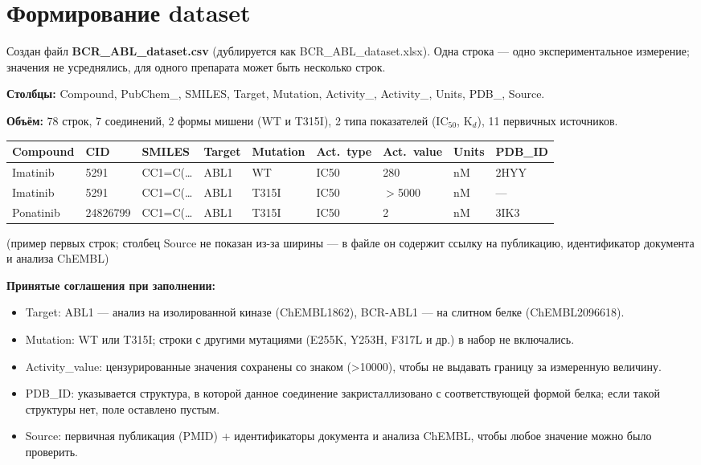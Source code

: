 \documentclass[12pt,a4paper]{article}
\newcommand{\code}[1]{{\ttfamily #1}}
\begin{document}
\section{Формирование dataset}

Создан файл \textbf{\code{BCR\_ABL\_dataset.csv}} (дублируется как
\code{BCR\_ABL\_dataset.xlsx}). Одна строка --- одно экспериментальное измерение;
значения не усреднялись, для одного препарата может быть несколько строк.

\medskip
\noindent\textbf{Столбцы:} \code{Compound}, \code{PubChem\_}\allowbreak\code{CID},
\code{SMILES}, \code{Target}, \code{Mutation}, \code{Activity\_}\allowbreak\code{type},
\code{Activity\_}\allowbreak\code{value}, \code{Units}, \code{PDB\_}\allowbreak\code{ID},
\code{Source}.

\medskip
\noindent\textbf{Объём:} 78 строк, 7 соединений, 2 формы мишени (WT и T315I),
2 типа показателей (IC$_{50}$, K$_d$), 11 первичных источников.

\begin{center}
\footnotesize
\begin{tabular}{L{1.6cm}L{1.5cm}L{1.4cm}L{1.0cm}L{1.1cm}L{1.0cm}L{1.1cm}L{0.8cm}L{1.4cm}}
\toprule
\textbf{Compound} & \textbf{CID} & \textbf{SMILES} & \textbf{Target} & \textbf{Muta\-tion} & \textbf{Act.\ type} & \textbf{Act.\ value} & \textbf{Units} & \textbf{PDB\_ID} \\
\midrule
Imatinib & 5291 & CC1=C(\ldots & ABL1 & WT & IC50 & 280 & nM & 2HYY \\
Imatinib & 5291 & CC1=C(\ldots & ABL1 & T315I & IC50 & $>$5000 & nM & --- \\
Ponatinib & 24826799 & CC1=C(\ldots & ABL1 & T315I & IC50 & 2 & nM & 3IK3 \\
\bottomrule
\end{tabular}
\end{center}
\noindent\footnotesize (пример первых строк; столбец \code{Source} не показан из-за
ширины --- в файле он содержит ссылку на публикацию, идентификатор документа и анализа
ChEMBL)\normalsize

\medskip
\noindent\textbf{Принятые соглашения при заполнении:}
\begin{itemize}[leftmargin=*,topsep=2pt,itemsep=2pt]
\item \code{Target}: \code{ABL1} --- анализ на изолированной киназе (ChEMBL1862),
\code{BCR-ABL1} --- на слитном белке (ChEMBL2096618).
\item \code{Mutation}: \code{WT} или \code{T315I}; строки с другими мутациями
(E255K, Y253H, F317L и др.) в набор не включались.
\item \code{Activity\_value}: цензурированные значения сохранены со знаком
(\code{>10000}), чтобы не выдавать границу за измеренную величину.
\item \code{PDB\_ID}: указывается структура, в которой данное соединение
закристаллизовано с соответствующей формой белка; если такой структуры нет, поле
оставлено пустым.
\item \code{Source}: первичная публикация (PMID) + идентификаторы документа и анализа
ChEMBL, чтобы любое значение можно было проверить.
\end{itemize}
\end{document}
